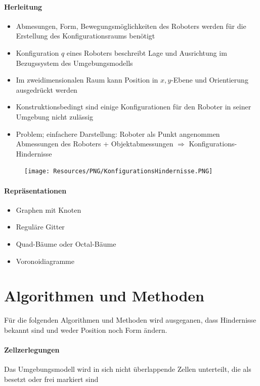 \paragraph{Herleitung}
\begin{itemize}
	\item Abmesungen, Form, Bewegungsmöglichkeiten des Roboters werden für die
		Erstellung des Konfigurationsraums benötigt
	\item Konfiguration $q$ eines Roboters beschreibt Lage und Ausrichtung im
		Bezugssystem des Umgebungsmodells
	\item Im zweidimensionalen Raum kann Position in $x,y$-Ebene und Orientierung
		ausgedrückt werden
	\item Konstruktionsbedingt sind einige Konfigurationen für den Roboter in
		seiner Umgebung nicht zulässig
	\item Problem; einfachere Darstellung:
	\subitem Roboter als Punkt angenommen
	\subitem Abmessungen des Roboters + Objektabmessungen $\Rightarrow$
		Konfigurations-Hindernisse
\end{itemize}
\begin{figure}[H]
	\begin{center}
		\texttt{[image: Resources/PNG/KonfigurationsHindernisse.PNG]}
		\caption{}
		\label{fig:PNG/KonfigurationsHindernisse.PNG}
	\end{center}
\end{figure}

\paragraph{Repräsentationen}
\begin{itemize}
	\item Graphen mit Knoten
	\item Reguläre Gitter
	\item Quad-Bäume oder Octal-Bäume
	\item Voronoidiagramme
\end{itemize}

\section{Algorithmen und Methoden}
Für die folgenden Algorithmen und Methoden wird ausgeganen, dass Hindernisse
bekannt sind und weder Position noch Form ändern.

\paragraph{Zellzerlegungen} Das Umgebungsmodell wird in sich nicht überlappende
Zellen unterteilt, die als besetzt oder frei markiert sind


